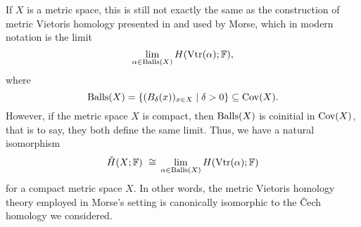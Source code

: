 If $X$ is a metric space, this is still not exactly the same as the construction of metric Vietoris homology presented in \cite{Vietoris.1927} and used by Morse, which in modern notation is the limit
\begin{equation*}
\lim_{\alpha \in \operatorname{Balls}(X)} H (\operatorname{Vtr} (\alpha); \mathbb{F}),
\end{equation*}
where 
\begin{equation*}
\operatorname{Balls} (X) = \left\{ ( B_{\delta} (x) )_{x \in X} \mid \delta > 0 \right\}
\subseteq \operatorname{Cov} (X).
\end{equation*}
However, if the metric space $X$ is compact, then $\operatorname{Balls} (X)$ is coinitial in $\operatorname{Cov} (X)$, that is to say, they both define the same limit.
Thus, we have a natural isomorphism
\begin{equation*}
\check{H} (X; \mathbb{F}) \ \cong \,
\lim_{\alpha \in \operatorname{Balls}(X)} H (\operatorname{Vtr} (\alpha); \mathbb{F})
\end{equation*}
for a compact metric space $X$.
In other words, the metric Vietoris homology theory employed in Morse's setting is canonically isomorphic to the \v{C}ech homology we considered.
